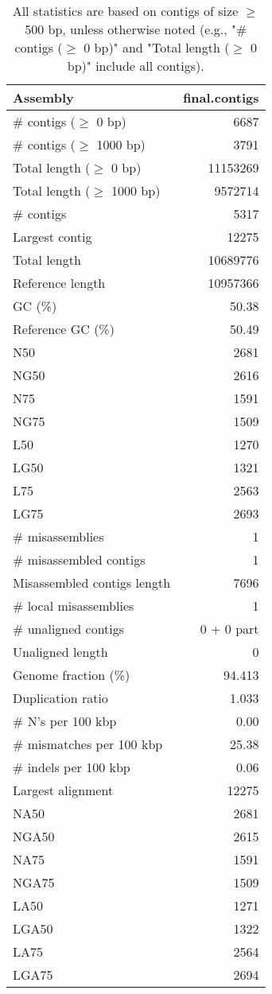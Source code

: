 \documentclass[12pt,a4paper]{article}
\begin{document}
\begin{table}[ht]
\begin{center}
\caption{All statistics are based on contigs of size $\geq$ 500 bp, unless otherwise noted (e.g., "\# contigs ($\geq$ 0 bp)" and "Total length ($\geq$ 0 bp)" include all contigs).}
\begin{tabular}{|l*{1}{|r}|}
\hline
Assembly & final.contigs \\ \hline
\# contigs ($\geq$ 0 bp) & 6687 \\ \hline
\# contigs ($\geq$ 1000 bp) & 3791 \\ \hline
Total length ($\geq$ 0 bp) & 11153269 \\ \hline
Total length ($\geq$ 1000 bp) & 9572714 \\ \hline
\# contigs & 5317 \\ \hline
Largest contig & 12275 \\ \hline
Total length & 10689776 \\ \hline
Reference length & 10957366 \\ \hline
GC (\%) & 50.38 \\ \hline
Reference GC (\%) & 50.49 \\ \hline
N50 & 2681 \\ \hline
NG50 & 2616 \\ \hline
N75 & 1591 \\ \hline
NG75 & 1509 \\ \hline
L50 & 1270 \\ \hline
LG50 & 1321 \\ \hline
L75 & 2563 \\ \hline
LG75 & 2693 \\ \hline
\# misassemblies & 1 \\ \hline
\# misassembled contigs & 1 \\ \hline
Misassembled contigs length & 7696 \\ \hline
\# local misassemblies & 1 \\ \hline
\# unaligned contigs & 0 + 0 part \\ \hline
Unaligned length & 0 \\ \hline
Genome fraction (\%) & 94.413 \\ \hline
Duplication ratio & 1.033 \\ \hline
\# N's per 100 kbp & 0.00 \\ \hline
\# mismatches per 100 kbp & 25.38 \\ \hline
\# indels per 100 kbp & 0.06 \\ \hline
Largest alignment & 12275 \\ \hline
NA50 & 2681 \\ \hline
NGA50 & 2615 \\ \hline
NA75 & 1591 \\ \hline
NGA75 & 1509 \\ \hline
LA50 & 1271 \\ \hline
LGA50 & 1322 \\ \hline
LA75 & 2564 \\ \hline
LGA75 & 2694 \\ \hline
\end{tabular}
\end{center}
\end{table}
\end{document}
